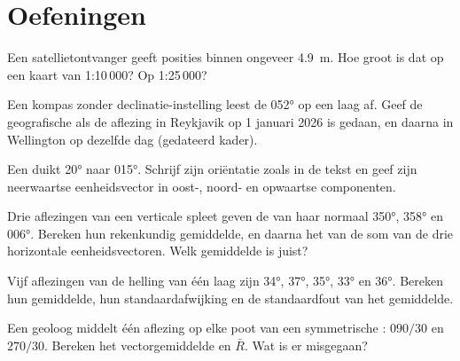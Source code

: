 \section{Oefeningen}

\begin{exercise}[$\star$]\label{exo:b1:field-lab-methods-1:1}
Een satellietontvanger geeft posities binnen ongeveer \qty{4.9}{m}. Hoe groot is dat op een kaart van
1:10\,000? Op 1:25\,000?
\end{exercise}

\begin{exercise}[$\star$]\label{exo:b1:field-lab-methods-1:2}
Een kompas zonder declinatie-instelling leest de  \ang{052} op een laag af. Geef de
geografische  als de aflezing in Reykjavik op 1 januari 2026 is gedaan, en daarna in
Wellington op dezelfde dag (gedateerd kader).
\end{exercise}

\begin{exercise}[$\star$]\label{exo:b1:field-lab-methods-1:3}
Een  duikt \ang{20} naar \ang{015}. Schrijf zijn oriëntatie zoals in de tekst en geef zijn neerwaartse
eenheidsvector in oost-, noord- en opwaartse componenten.
\end{exercise}

\begin{exercise}[$\star$]\label{exo:b1:field-lab-methods-1:4}
Drie aflezingen van een verticale spleet geven de  van haar normaal \ang{350}, \ang{358} en \ang{006}.
Bereken hun rekenkundig gemiddelde, en daarna het  van de som van de drie horizontale eenheidsvectoren.
Welk gemiddelde is juist?
\end{exercise}

\begin{exercise}[$\star\star$]\label{exo:b1:field-lab-methods-1:5}
Vijf aflezingen van de helling van één laag zijn \ang{34}, \ang{37}, \ang{35}, \ang{33} en \ang{36}. Bereken hun
gemiddelde, hun standaardafwijking en de standaardfout van het gemiddelde.
\end{exercise}

\begin{exercise}[$\star\star$]\label{exo:b1:field-lab-methods-1:6}
Een geoloog middelt één aflezing op elke poot van een symmetrische : $090/30$ en $270/30$. Bereken het
vectorgemiddelde en $\bar R$. Wat is er misgegaan?
\end{exercise}

